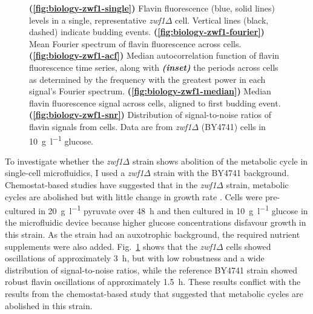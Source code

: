 \begin{figure}
  \caption[
    Flavin fluorescence levels in a single, representative \textit{zwf1$\Delta$} cell.
    Mean Fourier spectrum of flavin fluorescence across cells.
    Median autocorrelation function of flavin fluorescence time series, along with the periods across cells.
    Median flavin fluorescence signal across cells, aligned to first budding event.
    Distribution of signal-to-noise ratios of flavin signals from cells.
    Data are from \textit{zwf1$\Delta$} (BY4741) cells in \SI{10}{\gram~\litre^{-1}} glucose.
  ]{
    \textbf{(\ref{fig:biology-zwf1-single})}
    Flavin fluorescence (blue, solid lines) levels in a single, representative \textit{zwf1$\Delta$} cell.
    Vertical lines (black, dashed) indicate budding events.
    \textbf{(\ref{fig:biology-zwf1-fourier})}
    Mean Fourier spectrum of flavin fluorescence across cells.
    \textbf{(\ref{fig:biology-zwf1-acf})}
    Median autocorrelation function of flavin fluorescence time series, along with \textit{\textbf{(inset)}} the periods across cells as determined by the frequency with the greatest power in each signal's Fourier spectrum.
    \textbf{(\ref{fig:biology-zwf1-median})}
    Median flavin fluorescence signal across cells, aligned to first budding event.
    \textbf{(\ref{fig:biology-zwf1-snr})}
    Distribution of signal-to-noise ratios of flavin signals from cells.
    Data are from \textit{zwf1$\Delta$} (BY4741) cells in \SI{10}{\gram~\litre^{-1}} glucose.
  }
  \label{fig:biology-zwf1}
\end{figure}


To investigate whether the \textit{zwf1$\Delta$} strain shows abolition of the metabolic cycle in single-cell microfluidics, I used a \textit{zwf1$\Delta$} strain with the BY4741 background.
Chemostat-based studies have suggested that in the \textit{zwf1$\Delta$} strain, metabolic cycles are abolished but with little change in growth rate \parencite{tuCyclicChangesMetabolic2007}.
Cells were pre-cultured in \SI{20}{\gram~\litre^{-1}} pyruvate over \SI{48}{\hour} and then cultured in \SI{10}{\gram~\litre^{-1}} glucose in the microfluidic device because higher glucose concentrations disfavour growth in this strain.
As the strain had an auxotrophic background, the required nutrient supplements were also added.
%
Fig.\ \ref{fig:biology-zwf1} shows that the \textit{zwf1$\Delta$} cells showed oscillations of approximately \SI{3}{\hour}, but with low robustness and a wide distribution of signal-to-noise ratios, while the reference BY4741 strain showed robust flavin oscillations of approximately \SI{1.5}{\hour}.
These results conflict with the results from the chemostat-based study \parencite{tuCyclicChangesMetabolic2007} that suggested that metabolic cycles are abolished in this strain.


